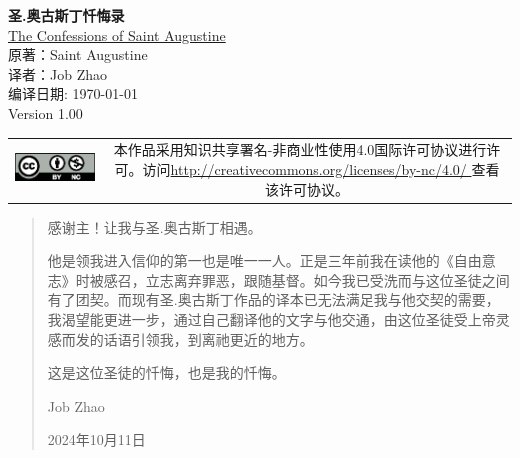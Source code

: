 \documentclass[12pt, a4paper, oneside]{ctexart}
\begin{document}
\setcounter{page}{0}
\begin{center}
	\Large{\textbf{圣.奥古斯丁忏悔录}} \\ \vspace{1em}
	\small{\href{https://faculty.georgetown.edu/jod/augustine/conf.pdf}{The Confessions of Saint Augustine}} \\ \vspace{2em}
	\small{原著：Saint Augustine} \\ \vspace{1em}
	\small{译者：Job Zhao} \\ \vspace{1em}
	\small{编译日期: \today} \\ \vspace{1em}
	\small{Version 1.00} \\ \vspace{1em}
\end{center}
\vfill
\vspace{20em}
\begin{tabular*}{\textwidth}{cc}
	\includegraphics{figure/by-nc.eps}
	& \begin{minipage}[b]{0.6\textwidth}
		\footnotesize
		本作品采用知识共享署名-非商业性使用4.0国际许可协议进行许可。访问\url{http://creativecommons.org/licenses/by-nc/4.0/ }查看该许可协议。
	\end{minipage}
\end{tabular*}
\vspace{2mm}
\thispagestyle{empty}

\newpage

\begin{abstract}
	感谢主！让我与圣.奥古斯丁相遇。

	他是领我进入信仰的第一也是唯一一人。正是三年前我在读他的《自由意志》时被感召，立志离弃罪恶，跟随基督。如今我已受洗而与这位圣徒之间有了团契。而现有圣.奥古斯丁作品的译本已无法满足我与他交契的需要，我渴望能更进一步，通过自己翻译他的文字与他交通，由这位圣徒受上帝灵感而发的话语引领我，到离祂更近的地方。

	
	这是这位圣徒的忏悔，也是我的忏悔。
	
	\hfill Job Zhao

	\hfill 2024年10月11日
    
\end{abstract}
\end{document}
